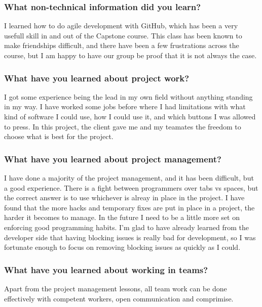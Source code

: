 \documentclass[draftclsnofoot,onecolumn,letterpaper,10pt]{IEEEtran}
\begin{document}
		\subsubsection{What non-technical information did you learn?}

		I learned how to do agile development with GitHub, which has been a very usefull skill in and out of the Capstone course.
		This class has been known to make friendships difficult, and there have been a few frustrations across the course, but I am happy to have our group be proof that it is not always the case.

		\subsubsection{What have you learned about project work?}

		I got some experience being the lead in my own field without anything standing in my way.
		I have worked some jobs before where I had limitations with what kind of software I could use, how I could use it, and which buttons I was allowed to press.
		In this project, the client gave me and my teamates the freedom to choose what is best for the project.

		\subsubsection{What have you learned about project management?}

		I have done a majority of the project management, and it has been difficult, but a good experience.
		There is a fight between programmers over tabs vs spaces, but the correct answer is to use whichever is alreay in place in the project.
		I have found that the more hacks and temporary fixes are put in place in a project, the harder it becomes to manage.
		In the future I need to be a little more set on enforcing good programming habits.
		I'm glad to have already learned from the developer side that having blocking issues is really bad for development, so I was fortunate enough to focus on removing blocking issues as quickly as I could.

		\subsubsection{What have you learned about working in teams?}

		Apart from the project management lessons, all team work can be done effectively with competent workers, open communication and comprimise.
\end{document}
